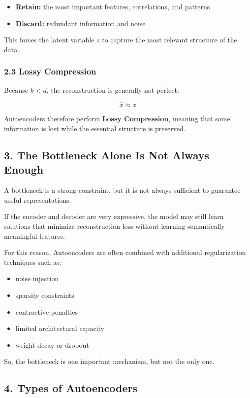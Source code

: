\documentclass[
  italian,
  11pt,
]{article}
\begin{document}
\begin{itemize}
\item
  \textbf{Retain:} the most important features, correlations, and
  patterns
\item
  \textbf{Discard:} redundant information and noise
\end{itemize}

This forces the latent variable \(z\) to capture the most relevant
structure of the data.

\subsubsection{2.3 Lossy Compression}\label{lossy-compression}

Because \(k < d\), the reconstruction is generally not perfect:

\[
\hat{x} \approx x
\]

Autoencoders therefore perform \textbf{Lossy Compression}, meaning that
some information is lost while the essential structure is preserved.

\subsection{3. The Bottleneck Alone Is Not Always
Enough}\label{the-bottleneck-alone-is-not-always-enough}

A bottleneck is a strong constraint, but it is not always sufficient to
guarantee useful representations.

If the encoder and decoder are very expressive, the model may still
learn solutions that minimize reconstruction loss without learning
semantically meaningful features.

For this reason, Autoencoders are often combined with additional
regularization techniques such as:

\begin{itemize}
\item
  noise injection
\item
  sparsity constraints
\item
  contractive penalties
\item
  limited architectural capacity
\item
  weight decay or dropout
\end{itemize}

So, the bottleneck is one important mechanism, but not the only one.

\subsection{4. Types of Autoencoders}\label{types-of-autoencoders}
\end{document}
